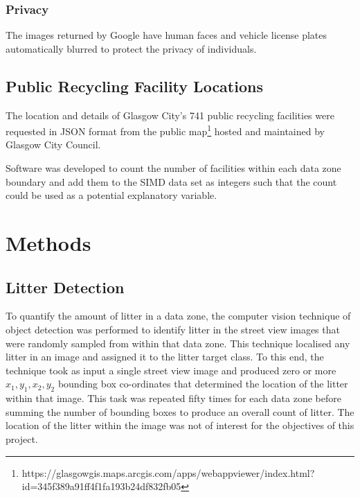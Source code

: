 \documentclass{thesis}
\begin{document}
\subsection*{Privacy}

The images returned by Google have human faces and vehicle license plates automatically blurred to protect the privacy of individuals.

\section{Public Recycling Facility Locations}

The location and details of Glasgow City's 741 public recycling facilities were requested in JSON format from the public map\footnote{https://glasgowgis.maps.arcgis.com/apps/webappviewer/index.html?id=345f389a91ff4f1fa193b24df832fb05} hosted and maintained by Glasgow City Council.

Software was developed to count the number of facilities within each data zone boundary and add them to the SIMD data set as integers such that the count could be used as a potential explanatory variable.


\chapter{Methods} \label{chapter:methods}

\section{Litter Detection}

To quantify the amount of litter in a data zone, the computer vision technique of object detection was performed to identify litter in the street view images that were randomly sampled from within that data zone. This technique localised any litter in an image and assigned it to the litter target class. To this end, the technique took as input a single street view image and produced zero or more $x_1,y_1,x_2,y_2$ bounding box co-ordinates that determined the location of the litter within that image. This task was repeated fifty times for each data zone before summing the number of bounding boxes to produce an overall count of litter. The location of the litter within the image was not of interest for the objectives of this project.
\end{document}
